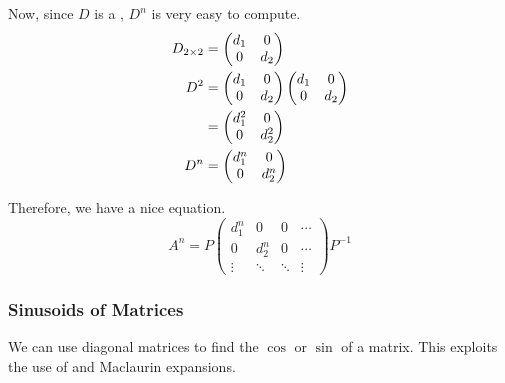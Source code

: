 Now, since $D$ is a , $D^{n}$ is very easy to compute.
\begin{align*}
  D_{2 \times 2} &=
                \begin{pmatrix}
                  d_{1} & 0 \\
                  0 & d_{2}
                \end{pmatrix} \\
  D^{2} &=
          \begin{pmatrix}
            d_{1} & 0 \\
            0 & d_{2}
          \end{pmatrix}
                \begin{pmatrix}
                  d_{1} & 0 \\
                  0 & d_{2}
                \end{pmatrix} \\
              &=
                \begin{pmatrix}
                  d_{1}^{2} & 0 \\
                  0 & d_{2}^{2}
                \end{pmatrix} \\
  D^{n} &=
          \begin{pmatrix}
            d_{1}^{n} & 0 \\
            0 & d_{2}^{n}
          \end{pmatrix}
\end{align*}

Therefore, we have a nice equation.
\begin{equation}\label{eq:Matrix_Exponent_Diagonalized-Expanded}
  A^{n} = P
  \begin{pmatrix}
    d_{1}^{n} & 0 & 0 & \cdots \\
    0 & d_{2}^{n} & 0 & \cdots \\
    \vdots & \ddots & \ddots & \vdots
  \end{pmatrix}
  P^{-1}
\end{equation}

\subsubsection{Sinusoids of Matrices}\label{subsubsec:Sinusoids_of_Matrices}
We can use diagonal matrices to find the $\cos$ or $\sin$ of a matrix.
This exploits the use of  and Maclaurin expansions.

